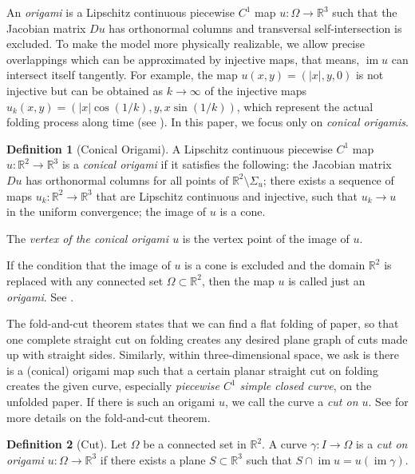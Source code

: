 \documentclass{amsart}
\theoremstyle{plain}
\theoremstyle{definition}
\newtheorem*{definition}{Definition}
\theoremstyle{remark}
\DeclareMathOperator{\im}{im}
\begin{document}
An \emph{origami} is a Lipschitz continuous piecewise $C^1$ map $u\colon\Omega\to\mathbb{R}^3$ such that the Jacobian matrix $Du$ has orthonormal columns 
and transversal self-intersection is excluded.
To make the model more physically realizable, we allow precise overlappings which can be approximated by injective maps, that means, 
$\im u$ can intersect itself tangently. 
For example, the map $u(x,y)=(|x|,y,0)$ is not injective but can be obtained as $k\to\infty$ of the injective maps $u_k(x,y)=(|x|\cos(1/k), y, x\sin(1/k))$, 
which represent the actual folding process along time (see \cite{dacorogna2008lipschitz}).
In this paper, we focus only on \emph{conical origamis}. 


\begin{definition}[Conical Origami]%
A Lipschitz continuous piecewise $C^1$ map $u\colon\mathbb{R}^2\to\mathbb{R}^3$ is a \emph{conical origami} if it satisfies the following:
the Jacobian matrix $Du$ has orthonormal columns for all points of $\mathbb{R}^2\setminus\Sigma_u$;
there exists a sequence of maps $u_k\colon\mathbb{R}^2\to\mathbb{R}^3$ that are Lipschitz continuous and injective, such that $u_k\to u$ in the uniform convergence;
the image of $u$ is a cone.

The \emph{vertex of the conical origami $u$} is the vertex point of the image of $u$.
\end{definition}

If the condition that the image of $u$ is a cone is excluded and the domain $\mathbb{R}^2$ is replaced with any connected set $\Omega\subset\mathbb{R}^2$, then the map $u$ is called just an \emph{origami}. %
See \cite{dacorogna2008lipschitz}.

The fold-and-cut theorem states that we can find a flat folding of paper, so that one complete straight cut on folding creates any desired plane graph of cuts made up with straight sides.
Similarly, within three-dimensional space, we ask is there is a (conical) origami map such that a certain planar straight cut on folding creates the given curve, especially \emph{piecewise $C^1$ simple closed curve}, on the unfolded paper.
If there is such an origami $u$, we call the curve a \emph{cut on $u$}.
See \cite{demaine2000folding} for more details on the fold-and-cut theorem. 


\begin{definition}[Cut]%
Let $\Omega$ be a connected set in $\mathbb{R}^2$.
A curve $\gamma\colon I\to\Omega$ is a \emph{cut on origami $u\colon\Omega\to\mathbb{R}^3$} if there exists a plane $S\subset\mathbb{R}^3$ such that $S\cap\im u=u(\im \gamma)$.
\end{definition}
\end{document}
